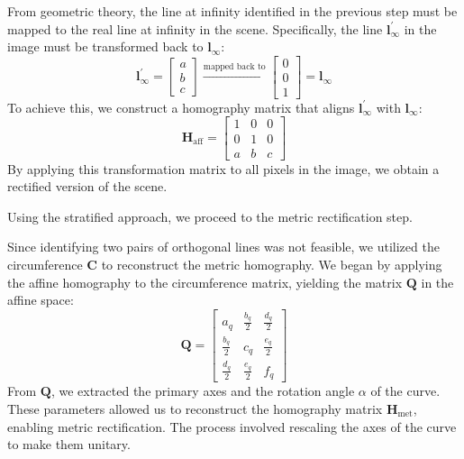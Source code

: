 \documentclass{Academic}
\begin{document}
From geometric theory, the line at infinity identified in the previous step must be mapped to the real line at infinity in the scene. 
Specifically, the line $\mathbf{l}^\prime_{\infty}$ in the image must be transformed back to $\mathbf{l}_{\infty}$:
\begin{equation}\mathbf{l}^\prime_{\infty}=\begin{bmatrix}
    a \\ b \\ c
\end{bmatrix}\xrightarrow[]{\text{mapped back to}}\begin{bmatrix}
    0 \\ 0 \\ 1
\end{bmatrix}=\mathbf{l}_{\infty}\end{equation}
To achieve this, we construct a homography matrix that aligns $\mathbf{l}^\prime_{\infty}$ with $\mathbf{l}_{\infty}$:
\begin{equation}\mathbf{H}_{\text{aff}}=\begin{bmatrix}
    1 & 0 & 0 \\
    0 & 1 & 0 \\
    a & b & c
\end{bmatrix}\end{equation}
By applying this transformation matrix to all pixels in the image, we obtain a rectified version of the scene.

Using the stratified approach, we proceed to the metric rectification step. 

Since identifying two pairs of orthogonal lines was not feasible, we utilized the circumference $\mathbf{C}$ to reconstruct the metric homography.
We began by applying the affine homography to the circumference matrix, yielding the matrix $\mathbf{Q}$ in the affine space:
\begin{equation}\mathbf{Q} = \begin{bmatrix} a_q & \frac{b_q}{2} & \frac{d_q}{2} \\ \frac{b_q}{2} & c_q & \frac{e_q}{2} \\ \frac{d_q}{2} & \frac{e_q}{2} & f_q\end{bmatrix}\end{equation}
From $\mathbf{Q}$, we extracted the primary axes and the rotation angle $\alpha$ of the curve. 
These parameters allowed us to reconstruct the homography matrix $\mathbf{H}_{\text{met}}$, enabling metric rectification.
The process involved rescaling the axes of the curve to make them unitary.
\end{document}
